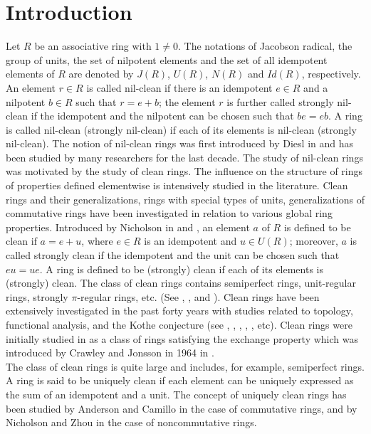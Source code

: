 \documentclass[12pt]{amsart}
\theoremstyle{definition}
\begin{document}
\section{Introduction}
Let $R$ be an associative ring with $1 \neq 0$. The notations of Jacobson radical, the group of units, the set of nilpotent elements and the set of all idempotent elements of $R$ are denoted by $J(R)$, $U(R)$, $N(R)$ and $Id(R)$, respectively. An element $r \in R$ is called
nil-clean if there is an idempotent $e \in R$ and a nilpotent $b \in R$ such that
$r = e+b$; the element $r$ is further called strongly nil-clean if the idempotent
and the nilpotent can be chosen such that $be = eb$. A ring is called nil-clean
(strongly nil-clean) if each of its elements is nil-clean (strongly nil-clean).
The notion of nil-clean rings was first introduced by Diesl in \cite{Diesl} and has been
studied by many researchers for the last decade. The study of nil-clean
rings was motivated by the study of clean rings. The influence on the structure of rings of properties defined elementwise is intensively studied in the literature. Clean rings and their generalizations, rings with special types of units, generalizations of commutative rings have been investigated in relation
to various global ring properties. Introduced by Nicholson
in \cite{nicolson} and \cite{nicolson2}, an element $a$ of $R$ is defined to be clean if $a = e + u$,
where $e \in R$ is an idempotent and $u \in U(R)$; moreover, $a$ is called strongly
clean if the idempotent and the unit can be chosen such that $eu = ue$. A
ring is defined to be (strongly) clean if each of its elements is (strongly)
clean. The class of clean rings contains semiperfect rings, unit-regular rings,
strongly $\pi$-regular rings, etc. (See \cite{Camillo}, \cite{Camillo2}, and \cite{Burgess}). Clean rings have
been extensively investigated in the past forty years with studies related to
topology, functional analysis, and the Kothe conjecture (see \cite{Ara},  \cite{Camillo3}, \cite{Han}, \cite{Lee}, \cite{Ster}, etc). Clean rings were initially studied in \cite{nicolson}
as a class of rings satisfying the exchange property which was introduced
by Crawley and Jonsson in 1964 in \cite{Crawley}.\\
 The class of clean rings is quite large and includes, for example, semiperfect rings. A ring is said to be uniquely clean if each element can be uniquely expressed as the sum of an idempotent and a unit. The concept of uniquely clean rings has been studied by Anderson and Camillo \cite{AC} in the case of commutative rings, and by Nicholson and Zhou \cite{NZ} in the case of noncommutative rings. 
\end{document}
